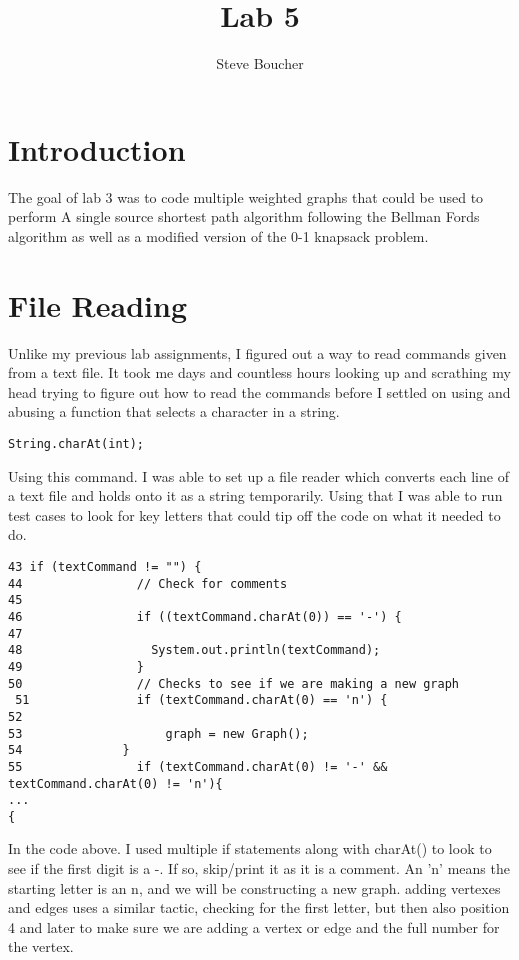 \documentclass{article}
\title{Lab 5}
\author{Steve Boucher}
\begin{document}



\section{Introduction}
The goal of lab 3 was to code multiple weighted graphs that could be used to perform A single source shortest path algorithm following the Bellman Fords algorithm as well as a modified version of the 0-1 knapsack problem. 

\section{File Reading}
Unlike my previous lab assignments, I figured out a way to read commands given from a text file. It took me days and countless hours looking up and scrathing my head trying to figure out how to read the commands before I settled on using and abusing a function that selects a character in a string.
\begin{verbatim}
String.charAt(int);
\end{verbatim}
Using this command. I was able to set up a file reader which converts each line of a text file and holds onto it as a string temporarily. Using that I was able to run test cases to look for key letters that could tip off the code on what it needed to do.

\begin{verbatim}
43 if (textCommand != "") {
44                // Check for comments
45
46                if ((textCommand.charAt(0)) == '-') {
47
48                  System.out.println(textCommand);
49                }
50                // Checks to see if we are making a new graph
 51               if (textCommand.charAt(0) == 'n') {
52
53                    graph = new Graph();
54              }
55                if (textCommand.charAt(0) != '-' && textCommand.charAt(0) != 'n'){
...
{\end{verbatim}
In the code above. I used multiple if statements along with charAt() to look to see if the first digit is a -. If so, skip/print it as it is a comment. An 'n' means the starting letter is an n, and we will be constructing a new graph. adding vertexes and edges uses a similar tactic, checking for the first letter, but then also position 4 and later to make sure we are adding a vertex or edge and the full number for the vertex.
\end{document}
